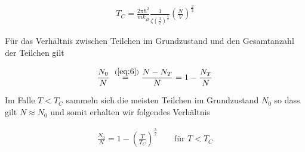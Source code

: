 \begin{align}
  \label{eq:13}
  \boxed{ T_C = \frac{ 2\pi \hbar^2}{m k_B }\frac{1}{\zeta(\frac{3}{2})^{\frac{3}{2}}} \left( \frac{N}{V} \right)^{\frac{2}{3}} }
\end{align}

Für das Verhältnis zwischen Teilchen im Grundzustand und den Gesamtanzahl der Teilchen gilt

\begin{align}
  \label{eq:14}
  \frac{N_0}{N} \stackrel{~(\ref{eq:6})}= \frac{N-N_T} N = 1-\frac {N_T} N 
\end{align}

Im Falle \(T<T_C\) sammeln sich die meisten Teilchen im Grundzustand \(N_0\) so dass gilt \(N\approx N_0\) und somit erhalten wir folgendes Verhältnis

\begin{align}
  \label{eq:15}
 \frac{N_0}{N} = 1 - \left( \frac{T}{T_C}\right)^{\frac{3}{2}} \qquad \text{für } T<T_C
\end{align}



